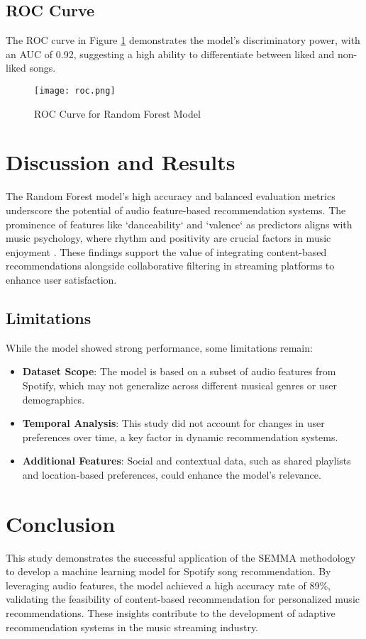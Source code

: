 \documentclass[12pt]{article}
\begin{document}
\subsection{ROC Curve}
The ROC curve in Figure \ref{fig:roc_curve} demonstrates the model's discriminatory power, with an AUC of 0.92, suggesting a high ability to differentiate between liked and non-liked songs.

\begin{figure}[H]
    \centering
    \texttt{[image: roc.png]}
    \caption{ROC Curve for Random Forest Model}
    \label{fig:roc_curve}
\end{figure}

\section{Discussion and Results}
The Random Forest model’s high accuracy and balanced evaluation metrics underscore the potential of audio feature-based recommendation systems. The prominence of features like `danceability` and `valence` as predictors aligns with music psychology, where rhythm and positivity are crucial factors in music enjoyment \cite{music_psychology}. These findings support the value of integrating content-based recommendations alongside collaborative filtering in streaming platforms to enhance user satisfaction.

\subsection{Limitations}
While the model showed strong performance, some limitations remain:
\begin{itemize}
    \item \textbf{Dataset Scope}: The model is based on a subset of audio features from Spotify, which may not generalize across different musical genres or user demographics.
    \item \textbf{Temporal Analysis}: This study did not account for changes in user preferences over time, a key factor in dynamic recommendation systems.
    \item \textbf{Additional Features}: Social and contextual data, such as shared playlists and location-based preferences, could enhance the model’s relevance.
\end{itemize}

\section{Conclusion}
This study demonstrates the successful application of the SEMMA methodology to develop a machine learning model for Spotify song recommendation. By leveraging audio features, the model achieved a high accuracy rate of 89\%, validating the feasibility of content-based recommendation for personalized music recommendations. These insights contribute to the development of adaptive recommendation systems in the music streaming industry.
\end{document}
